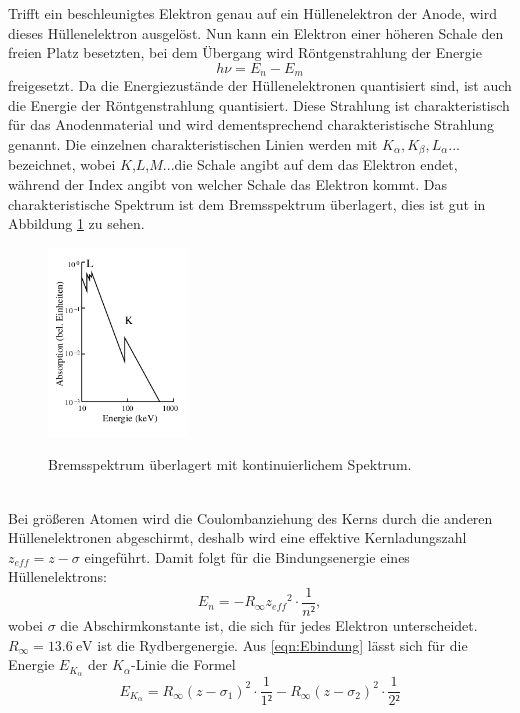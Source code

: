 Trifft ein beschleunigtes Elektron genau auf ein Hüllenelektron der Anode,
wird dieses Hüllenelektron ausgelöst. Nun kann ein Elektron einer höheren Schale den
freien Platz besetzten, bei dem Übergang wird Röntgenstrahlung der Energie
\begin{equation}
  h \nu=E_n -E_m
\end{equation}
freigesetzt. Da die Energiezustände der Hüllenelektronen quantisiert sind, ist auch die
Energie der Röntgenstrahlung quantisiert. Diese Strahlung ist charakteristisch für das
Anodenmaterial und wird dementsprechend charakteristische Strahlung genannt.
Die einzelnen charakteristischen Linien werden mit $K_{\alpha}, K_{\beta}, L_{\alpha}...$
bezeichnet, wobei $K$,$L$,$M$...die Schale angibt auf dem das Elektron endet, während
der Index angibt von welcher Schale das Elektron kommt. Das charakteristische Spektrum
ist dem Bremsspektrum überlagert, dies ist gut in Abbildung \ref{fig:kont2} zu sehen.
\begin{figure}
  \centering
  \includegraphics[height=5cm]{kont2.png}
  \caption{Bremsspektrum überlagert mit kontinuierlichem Spektrum.}
  \label{fig:kont2}
  \cite{skript}
\end{figure}
\\
Bei größeren Atomen wird die Coulombanziehung des Kerns durch die anderen Hüllenelektronen
abgeschirmt, deshalb wird eine effektive Kernladungszahl $z_{eff}=z-\sigma$
eingeführt. Damit folgt für die Bindungsenergie eines Hüllenelektrons:
\begin{equation}
  E_n= -R_{\infty}{z_{eff}}^{2}\cdot \frac{1}{n²},
  \label{eqn:Ebindung}
\end{equation}
wobei $\sigma$ die Abschirmkonstante ist, die sich für jedes Elektron unterscheidet.
$R_{\infty}=\SI{13.6}{\eV}$ ist die Rydbergenergie.
Aus \ref{eqn:Ebindung} lässt sich für die Energie $E_{K_{\alpha}}$ der $K_{\alpha}$-Linie
die Formel
\begin{equation}
  E_{K_{\alpha}}=R_{\infty}(z-\sigma_{1})^{2}\cdot\frac{1}{1²}-R_{\infty}(z-\sigma_{2})^{2}\cdot\frac{1}{2²}
  \label{eqn:k}
\end{equation}
